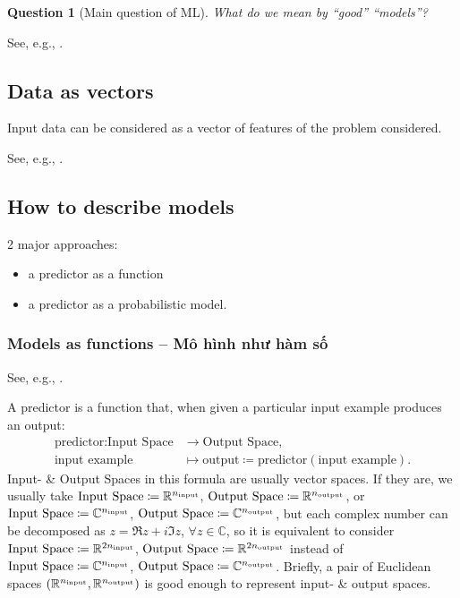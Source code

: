 \documentclass{article}
\newtheorem{question}{Question}
\begin{document}
\begin{question}[Main question of ML]
	What do we mean by ``good'' ``models''?
\end{question}
See, e.g., \cite[Chap. 8, Sect. 8.1: Data, Models, \& Learning]{Deisenroth_Faisal_Ong2024}.

\subsection{Data as vectors}
Input data can be considered as a vector of features of the problem considered.

See, e.g., \cite[Chap. 8, Sect. 8.1.1: Data as Vectors]{Deisenroth_Faisal_Ong2024}.

\subsection{How to describe models}
2 major approaches:
\begin{itemize}
	\item a predictor as a function
	\item a predictor as a probabilistic model.
\end{itemize}

\subsubsection{Models as functions -- Mô hình như hàm số}
See, e.g., \cite[Chap. 8, Sect. 8.1.2: Models as Functions]{Deisenroth_Faisal_Ong2024}.

A predictor is a function that, when given a particular input example produces an output:
\begin{align*}
	\mbox{predictor}:\mbox{Input Space}&\to\mbox{Output Space},\\
	\mbox{input example}&\mapsto\mbox{output}\coloneqq\mbox{predictor}(\mbox{input example}).
\end{align*}
Input- \& Output Spaces in this formula are usually vector spaces. If they are, we usually take $\mbox{Input Space}\coloneqq\mathbb{R}^{n_{\rm input}}$, $\mbox{Output Space}\coloneqq\mathbb{R}^{n_{\rm output}}$, or $\mbox{Input Space}\coloneqq\mathbb{C}^{n_{\rm input}}$, $\mbox{Output Space}\coloneqq\mathbb{C}^{n_{\rm output}}$, but each complex number can be decomposed as $z = \Re z + i\Im z$, $\forall z\in\mathbb{C}$, so it is equivalent to consider $\mbox{Input Space}\coloneqq\mathbb{R}^{2n_{\rm input}}$, $\mbox{Output Space}\coloneqq\mathbb{R}^{2n_{\rm output}}$ instead of $\mbox{Input Space}\coloneqq\mathbb{C}^{n_{\rm input}}$, $\mbox{Output Space}\coloneqq\mathbb{C}^{n_{\rm output}}$. Briefly, a pair of Euclidean spaces $(\mathbb{R}^{n_{\rm input}},\mathbb{R}^{n_{\rm output}})$ is good enough to represent input- \& output spaces.
\end{document}
